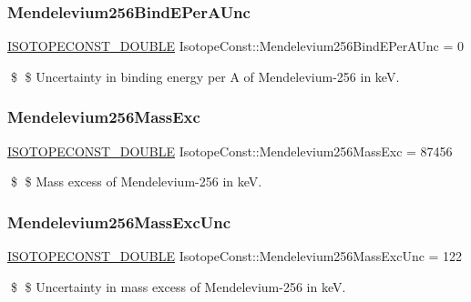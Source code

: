 \subsubsection{\texorpdfstring{Mendelevium256\+Bind\+E\+Per\+A\+Unc}{Mendelevium256BindEPerAUnc}}
{\footnotesize\ttfamily \mbox{\hyperlink{group___isotope_const-_macros_ga8f45a7272ce02c0b4c65c44636ed719a}{I\+S\+O\+T\+O\+P\+E\+C\+O\+N\+S\+T\+\_\+\+D\+O\+U\+B\+LE}} Isotope\+Const\+::\+Mendelevium256\+Bind\+E\+Per\+A\+Unc = 0}

\$ \$ Uncertainty in binding energy per A of Mendelevium-\/256 in keV. \mbox{\label{group___isotope_const-_mendelevium-_md256_ga929bd1bcefa68bf6627fc181fb92c4d0}} 
\subsubsection{\texorpdfstring{Mendelevium256\+Mass\+Exc}{Mendelevium256MassExc}}
{\footnotesize\ttfamily \mbox{\hyperlink{group___isotope_const-_macros_ga8f45a7272ce02c0b4c65c44636ed719a}{I\+S\+O\+T\+O\+P\+E\+C\+O\+N\+S\+T\+\_\+\+D\+O\+U\+B\+LE}} Isotope\+Const\+::\+Mendelevium256\+Mass\+Exc = 87456}

\$ \$ Mass excess of Mendelevium-\/256 in keV. \mbox{\label{group___isotope_const-_mendelevium-_md256_ga80206f15298462fc17eca9f28724e3a0}} 
\subsubsection{\texorpdfstring{Mendelevium256\+Mass\+Exc\+Unc}{Mendelevium256MassExcUnc}}
{\footnotesize\ttfamily \mbox{\hyperlink{group___isotope_const-_macros_ga8f45a7272ce02c0b4c65c44636ed719a}{I\+S\+O\+T\+O\+P\+E\+C\+O\+N\+S\+T\+\_\+\+D\+O\+U\+B\+LE}} Isotope\+Const\+::\+Mendelevium256\+Mass\+Exc\+Unc = 122}

\$ \$ Uncertainty in mass excess of Mendelevium-\/256 in keV. \mbox{\label{group___isotope_const-_mendelevium-_md256_gaec2850ecc1de9728c17f01ed139257a2}} 
